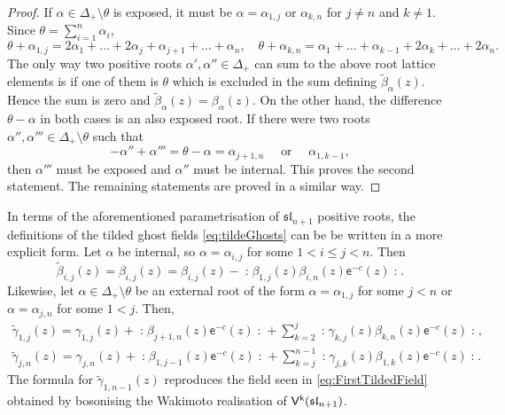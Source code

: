 \documentclass[10pt,a4paper]{amsart}
\numberwithin{equation}{section}
\newcommand{\ee}{\mathsf{e}}   %
\newcommand{\kk}{\mathsf{k}}   %
\DeclarePairedDelimiter{\brac}{\lparen}{\rparen}   %
\newcommand{\no}[1]{\mathopen{:} #1 \mathclose{:}} %
\newcommand{\alg}[1]{\mathfrak{#1}}  %
\newcommand{\VOA}[1]{\mathsf{#1}}    %
\newcommand{\SLA}[2]{\alg{#1}_{#2}}                      %
\newcommand{\slnpone}{\SLA{sl}{n+1}}
\newcommand{\proots}{\Delta_+}                                       %
\newcommand{\sroot}[1]{\alpha_{#1}}                                  %
\newcommand{\hroot}{\theta}                                          %
\newcommand{\uaffvoa}[2]{\VOA{V}^{#1}\brac{#2}}                   %
\theoremstyle{plain}
\begin{document}
\begin{proof}
    If $\alpha \in \proots \setminus \hroot$ is exposed, it must be $\alpha = \sroot{1,j}$ or $\sroot{k,n}$ for $j\neq n$ and $k \neq 1$. Since $\theta = \sum_{i=1}^n \alpha_i$,
    \begin{equation}
        \hroot+\sroot{1,j} = 2\sroot{1} + \dots + 2 \sroot{j} + \sroot{j+1} + \dots + \sroot{n}, \quad \hroot+\sroot{k,n} = \sroot{1} + \dots + \sroot{k-1} + 2\sroot{k} + \dots + 2\sroot{n}.
    \end{equation}
    The only way two positive roots $\alpha',\alpha'' \in \proots$ can sum to the above root lattice elements is if one of them is $\hroot$ which is excluded in the sum defining $\tilde{\beta}_\alpha(z)$. Hence the sum is zero and $\tilde{\beta}_\alpha(z) = \beta_\alpha(z)$. On the other hand, the difference $\hroot-\alpha$ in both cases is an also exposed root. If there were two roots $\alpha'',\alpha''' \in \proots \setminus \hroot$ such that 
    \begin{equation}
        -\alpha''+\alpha'''=\hroot-\alpha = \sroot{j+1,n} \quad \text{ or } \quad \sroot{1,k-1}, 
    \end{equation}
    then $\alpha'''$ must be exposed and $\alpha''$ must be internal. This proves the second statement. The remaining statements are proved in a similar way. 
\end{proof}

\noindent In terms of the aforementioned parametrisation of $\slnpone$ positive roots, the definitions of the tilded ghost fields \eqref{eq:tildeGhosts} can be be written in a more explicit form. Let $\alpha$ be internal, so $\alpha =\sroot{i,j}$ for some $1<i\leq j < n$. Then
%
\begin{equation} \label{eq:tildeBsimpler}
    \tilde{\beta}_{i,j}(z) = \beta_{i,j}(z)
   = \beta_{i,j}(z) - \no{\beta_{1,j} (z) \beta_{i,n}(z)\ee^{-c}(z)}.
\end{equation}
%
Likewise, let $\alpha \in \proots \setminus \hroot$ be an external root of the form $\alpha =\sroot{1,j}$ for some $j < n$ or $\alpha = \sroot{j,n}$ for some $1<j$. Then,
%
\begin{equation}
\begin{gathered}
    \tilde{\gamma}_{1,j}(z) 
    = \gamma_{1,j}(z) + \no{\beta_{j+1,n}(z)\ee^{-c}(z)} + \sum_{k=2}^{j} \no{\gamma_{k,j}(z)\beta_{k,n}(z)\ee^{-c}(z)}, \\
    \tilde{\gamma}_{j,n}(z) 
    = \gamma_{j,n}(z) + \no{\beta_{1,j-1}(z)\ee^{-c}(z)} + \sum_{k=j}^{n-1} \no{\gamma_{j,k}(z)\beta_{1,k}(z)\ee^{-c}(z)}.
\end{gathered}
\end{equation}
%
The formula for $\tilde{\gamma}_{1,n-1}(z)$ reproduces the field seen in \eqref{eq:FirstTildedField} obtained by bosonising the Wakimoto realisation of $\uaffvoa{\kk}{\slnpone}$.
\end{document}
